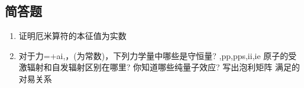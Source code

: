 
\subsection{简答题}
\begin{enumerate}
\item 证明厄米算符的本征值为实数
\item 对于力=+ai,，(为常数)，下列力学量中哪些是守恒量?
,pp,pps,ii,ie
原子的受激辐射和自发辐射区别在哪里?
你知道哪些纯量子效应?
写出泡利矩阵
满足的对易关系
\end{enumerate}